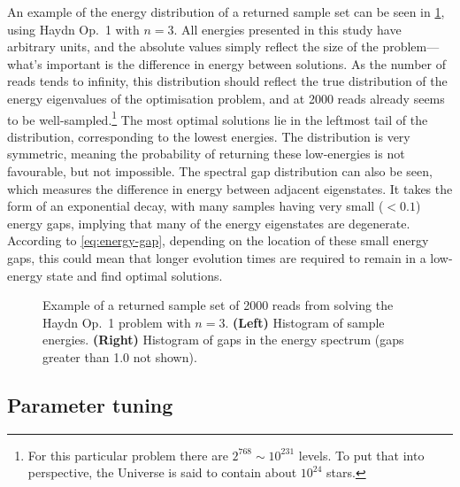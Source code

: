 \documentclass[12pt]{article}
\theoremstyle{definition}
\begin{document}
An example of the energy distribution of a returned sample set can be seen in \cref{fig:histograms}, using Haydn Op.\ 1 with $n=3$. All energies presented in this study have arbitrary units, and the absolute values simply reflect the size of the problem---what's important is the difference in energy between solutions. As the number of reads tends to infinity, this distribution should reflect the true distribution of the energy eigenvalues of the optimisation problem, and at \num{2000} reads already seems to be well-sampled.\footnote{For this particular problem there are $2^{768}\sim 10^{231}$ levels. To put that into perspective, the Universe is said to contain about $10^{24}$ stars.} The most optimal solutions lie in the leftmost tail of the distribution, corresponding to the lowest energies. The distribution is very symmetric, meaning the probability of returning these low-energies is not favourable, but not impossible.
The spectral gap distribution can also be seen, which measures the difference in energy between adjacent eigenstates. It takes the form of an exponential decay, with many samples having very small ($<0.1$) energy gaps, implying that many of the energy eigenstates are degenerate. According to \cref{eq:energy-gap}, depending on the location of these small energy gaps, this could mean that longer evolution times are required to remain in a low-energy state and find optimal solutions.

\begin{figure}[t]
    \centering\footnotesize
    
    \caption{Example of a returned sample set of \num{2000} reads from solving the Haydn Op.\ 1 problem with $n=3$. \textbf{(Left)} Histogram of sample energies. \textbf{(Right)} Histogram of gaps in the energy spectrum (gaps greater than \num{1.0} not shown).}
    \label{fig:histograms}
\end{figure}

\subsection{Parameter tuning}
\end{document}
